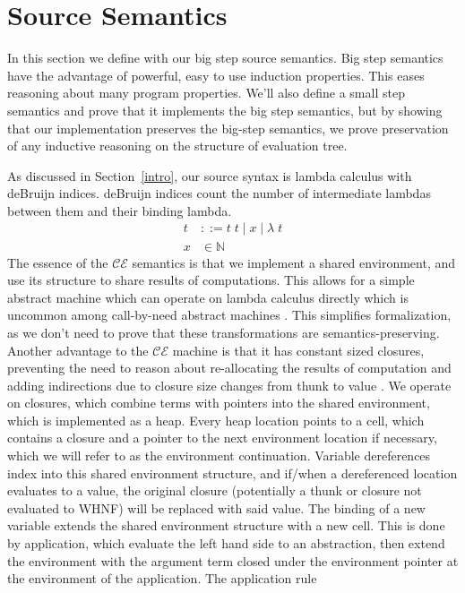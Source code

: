 \section{Source Semantics} \label{cem_big}

In this section we define with our big step source semantics. Big step semantics
have the advantage of powerful, easy to use induction properties. This eases
reasoning about many program properties. We'll also define a small step
semantics and prove that it implements the big step semantics, but by showing
that our implementation preserves the big-step semantics, we prove preservation
of any inductive reasoning on the structure of evaluation tree.  

As discussed in Section~\ref{intro}, our source syntax is lambda calculus with
deBruijn indices. deBruijn indices count the number of intermediate lambdas
between them and their binding lambda.  
\begin{align*}
 t &::= t \; t \; | \; x \; | \;  \lambda \; t \\
 x &\in \mathbb{N}
\end{align*}
The essence of the $\mathcal{CE}$ semantics is that we implement a shared
environment, and use its structure to share results of computations. This allows
for a simple abstract machine which can operate on lambda calculus directly
which is uncommon among call-by-need abstract machines
\cite{stg,launchbury,TIM}. This simplifies formalization, as we don't need to
prove that these transformations are semantics-preserving. Another advantage to
the $\mathcal{CE}$ machine is that it has constant sized closures, preventing
the need to reason about re-allocating the results of computation and adding
indirections due to closure size changes from thunk to value \cite{stg}. We
operate on closures, which combine terms with pointers into the shared
environment, which is implemented as a heap. Every heap location points to a
cell, which contains a closure and a pointer to the next environment location if
necessary, which we will refer to as the environment continuation. Variable
dereferences index into this shared environment structure, and if/when a
dereferenced location evaluates to a value, the original closure (potentially a
thunk or closure not evaluated to WHNF) will be replaced with said value. The
binding of a new variable extends the shared environment structure with a new
cell. This is done by application, which evaluate the left hand side to an
abstraction, then extend the environment with the argument term closed under the
environment pointer at the environment of the application. The application rule
